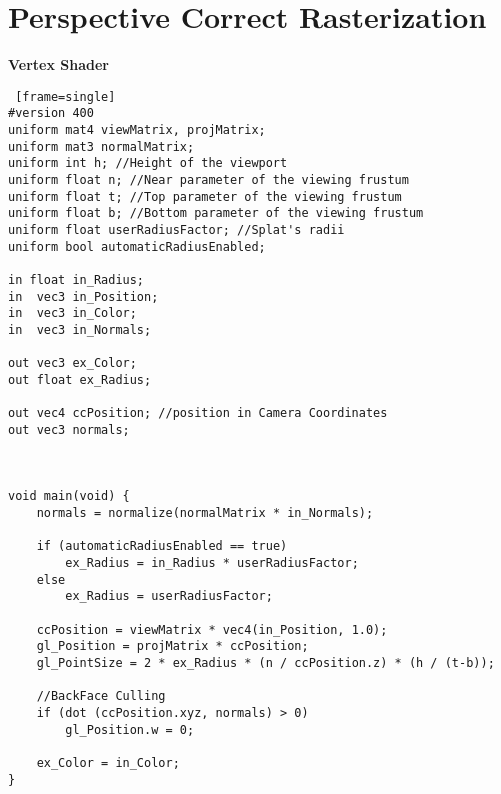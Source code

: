 \section{Perspective Correct Rasterization}

\textbf{Vertex Shader}
\begin{lstlisting} [frame=single]
#version 400
uniform mat4 viewMatrix, projMatrix;
uniform mat3 normalMatrix;
uniform int h; //Height of the viewport
uniform float n; //Near parameter of the viewing frustum
uniform float t; //Top parameter of the viewing frustum
uniform float b; //Bottom parameter of the viewing frustum
uniform float userRadiusFactor; //Splat's radii
uniform bool automaticRadiusEnabled;

in float in_Radius;
in  vec3 in_Position;
in  vec3 in_Color;
in 	vec3 in_Normals;

out vec3 ex_Color;
out float ex_Radius;

out vec4 ccPosition; //position in Camera Coordinates
out vec3 normals;



void main(void) {
	normals = normalize(normalMatrix * in_Normals);

	if (automaticRadiusEnabled == true)
		ex_Radius = in_Radius * userRadiusFactor;
	else
		ex_Radius = userRadiusFactor;

	ccPosition = viewMatrix * vec4(in_Position, 1.0);
	gl_Position = projMatrix * ccPosition;
	gl_PointSize = 2 * ex_Radius * (n / ccPosition.z) * (h / (t-b));

	//BackFace Culling
	if (dot (ccPosition.xyz, normals) > 0)
		gl_Position.w = 0;

	ex_Color = in_Color;
}
\end{lstlisting}

